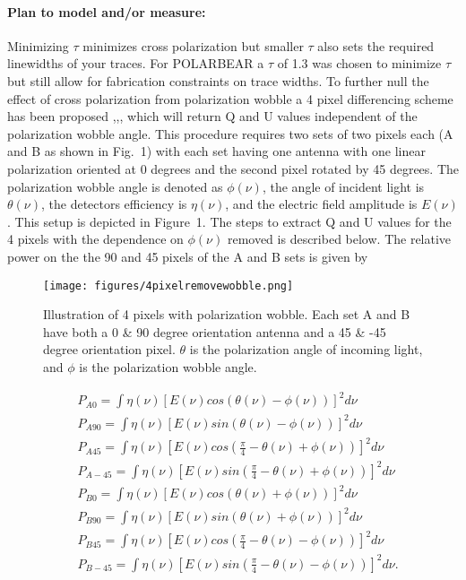 \paragraph{Plan to model and/or measure:}
Minimizing $\tau$ minimizes cross polarization but smaller $\tau$ also sets the required linewidths of your traces. For POLARBEAR a $\tau$ of 1.3 was chosen to minimize $\tau$ but still allow for fabrication constraints on trace widths. To further null the effect of cross polarization from polarization wobble a 4 pixel differencing scheme has been proposed \cite{TokiThesis},\cite{TokiMemo1},\cite{TokiMemo2}, which will return Q and U values independent of the polarization wobble angle. This procedure requires two sets of two pixels each (A and B as shown in Fig.~1) with each set having one antenna with one linear polarization oriented at 0 degrees and the second pixel rotated by 45 degrees. The polarization wobble angle is denoted as $\phi(\nu)$, the angle of incident light is $\theta(\nu)$, the detectors efficiency is $\eta(\nu)$, and the electric field amplitude is $E(\nu)$. This setup is depicted in Figure~1. The steps to extract Q and U values for the 4 pixels with the dependence on $\phi(\nu)$ removed is described below. The relative power on the the 90 and 45 pixels of the A and B sets is given by
\begin{figure}
\centering
\texttt{[image: figures/4pixelremovewobble.png]}
\caption{Illustration of 4 pixels with polarization wobble. Each set A and B have both a 0 \& 90 degree orientation antenna and a 45 \& -45 degree orientation pixel. $\theta$ is the polarization angle of incoming light, and $\phi$ is the polarization wobble angle.}
\label{4pixelwobbleremoval}
\end{figure}
\begin{equation}
\begin{split}
&P_{A0} = \int \eta(\nu)[E(\nu)cos(\theta(\nu)-\phi(\nu))]^2 d\nu \\
&P_{A90} = \int \eta(\nu)[E(\nu)sin(\theta(\nu)-\phi(\nu))]^2 d\nu \\
&P_{A45} = \int \eta(\nu)[E(\nu)cos(\frac{\pi}{4}-\theta(\nu)+\phi(\nu))]^2 d\nu \\
&P_{A-45} = \int \eta(\nu)[E(\nu)sin(\frac{\pi}{4}-\theta(\nu)+\phi(\nu))]^2 d\nu \\
&P_{B0} = \int \eta(\nu)[E(\nu)cos(\theta(\nu)+\phi(\nu))]^2 d\nu \\
&P_{B90} = \int \eta(\nu)[E(\nu)sin(\theta(\nu)+\phi(\nu))]^2 d\nu \\
&P_{B45} = \int \eta(\nu)[E(\nu)cos(\frac{\pi}{4}-\theta(\nu)-\phi(\nu))]^2 d\nu \\
&P_{B-45} = \int \eta(\nu)[E(\nu)sin(\frac{\pi}{4}-\theta(\nu)-\phi(\nu))]^2 d\nu .
\end{split}
\end{equation}
